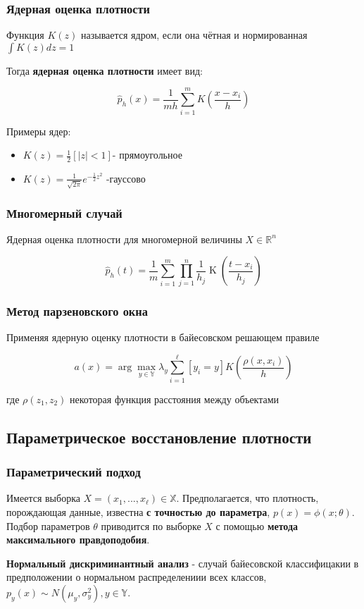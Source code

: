 \documentclass{beamer}
\DeclareMathOperator{\K}{K}
\begin{document}
	\begin{frame}
		\frametitle{Ядерная оценка плотности}
		Функция $K(z)$ называется ядром, если она чётная и нормированная $\int K(z) dz = 1$
		
		\vspace{5pt}
		
		Тогда \textbf{ядерная оценка плотности} имеет вид:
		
		\[
		\hat{p}_h(x) = \frac{1}{mh} \sum_{i=1}^{m}K(\frac{x - x_i}{h})
		\]
		
		Примеры ядер:
		\begin{itemize}
			\item $K(z) = \frac{1}{2} [|z| < 1]$- прямоугольное
			\item $K(z) = \frac{1}{\sqrt{2\pi}} e^{-\frac{1}{2} z^2}$ -гауссово
		\end{itemize}
	\end{frame}
	
	\begin{frame}
		\frametitle{Многомерный случай}
		Ядерная оценка плотности для многомерной величины $X \in \mathbb{R}^n$
		
		\[
		\hat{p}_h(t) = \frac{1}{m} \sum_{i=1}^{m} \prod_{j=1}^{n} \frac{1}{h_j} \K (\frac{t - x_i}{h_j})
		\]
	\end{frame}
	
	\begin{frame}
		\frametitle{Метод парзеновского окна}
		Применяя ядерную оценку плотности в байесовском решающем правиле
		
		\[
		a(x) = \arg \max_{y \in \mathbb{Y}} \lambda_{y} \sum_{i=1}^{\ell} [y_i = y] K(\frac{\rho(x, x_i)}{h})
		\]
		
		где $\rho(z_1, z_2)$ некоторая функция расстояния между объектами
	\end{frame}
	
	\subsection{Параметрическое восстановление плотности}
	
	\begin{frame}
		\frametitle{Параметрический подход}
		Имеется выборка $X = (x_1, ..., x_{\ell}) \in \mathbb{X}$. Предполагается, что плотность, порождающая данные, известна \textbf{с точностью до параметра}, $p(x) = \phi(x; \theta)$. Подбор параметров $\theta$ приводится по выборке $X$ с помощью \textbf{метода максимального правдоподобия}.
		
		\vspace{15pt}
		
		\textbf{Нормальный дискриминантный анализ} - случай байесовской классифицакии в предположении о нормальном распределениии всех классов, $p_y(x) \sim N(\mu_y, \sigma_y^2), y \in \mathbb{Y}$.
	\end{frame}
	
\end{document}
